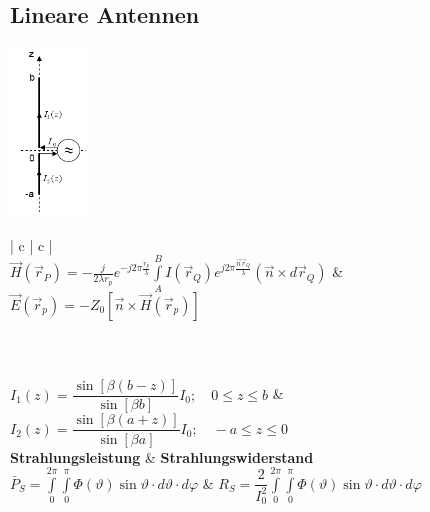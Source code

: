 		
	\subsection{Lineare Antennen}
		\begin{minipage}{2.2cm}
			\includegraphics[height=4.5cm]{./images/LinAnt_Stromverteilung.png}
        \end{minipage}
		\begin{minipage}{12.7cm}
		\renewcommand{\arraystretch}{1.6}
		\begin{tabular}{| c | c |}
    		\hline
    	 \\        
    		\hline
    $\vec{H}(\vec{r}_P) = - \frac{j}{2 \lambda r_p} e^{-j 2 \pi \frac{r_p}{\lambda}}     
    \int\limits_A^B I(\vec{r}_Q) e^{j 2 \pi \frac{\vec{n} \vec{r}_Q}{\lambda}} (\vec{n} \times
    d \vec{r}_Q) $
	&
    $ \vec{E}(\vec{r}_p) = - Z_0 \left[ \vec{n} \times \vec{H} (\vec{r}_p) \right] $
    \\
			\hline
    		\hline   
    	\\
    		\hline
     \\
			\hline
    		\hline
    	 \\
    		\hline
    	$ I_1 (z) = \dfrac{\sin{[\beta (b - z)]}}{\sin{[\beta b]}} I_0 ; \quad 0 \leq z \leq
    	b$
    	& 
    	$ I_2 (z) = \dfrac{\sin{[\beta (a + z)]}}{\sin{[\beta a]}} I_0 ; \quad -a \leq z \leq
    	0$ \\
    	
    		\hline
    		\hline
    	\textbf{Strahlungsleistung} & \textbf{Strahlungswiderstand} \\
    		\hline
    	$ \bar{P}_S = \int\limits_0^{2\pi}\int\limits_0^{\pi} \Phi(\vartheta) \sin \vartheta \cdot
    	d \vartheta \cdot d \varphi	$ 
    	& 
    	$ R_S = \dfrac{2}{I_0^2 } \int\limits_0^{2\pi}\int\limits_0^{\pi} \Phi(\vartheta) \sin \vartheta \cdot
    	d \vartheta \cdot d \varphi	$ \\
    		\hline
   		\end{tabular}
		\renewcommand{\arraystretch}{1}
        \end{minipage}		
